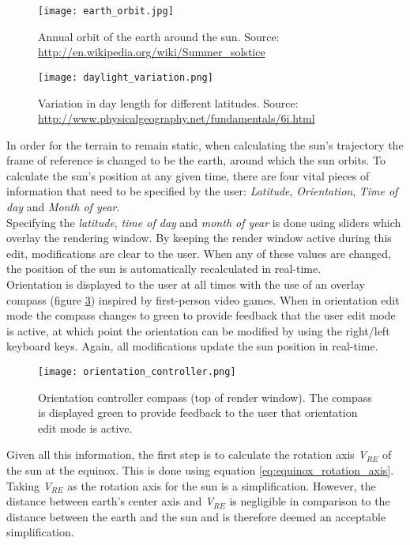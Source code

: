\begin{figure}
\center
	\texttt{[image: earth\_orbit.jpg]}
	\caption{ Annual orbit of the earth around the sun. Source: \protect\url{http://en.wikipedia.org/wiki/Summer_solstice}}
	\label{fig:earth_orbit}
\end{figure}

\begin{figure}
\center
	\texttt{[image: daylight\_variation.png]}
	\caption{ Variation in day length for different latitudes. Source: \protect\url{http://www.physicalgeography.net/fundamentals/6i.html}}
	\label{fig:daylight_variation}
\end{figure}

In order for the terrain to remain static, when calculating the sun's trajectory the frame of reference is changed to be the earth, around which the sun orbits. To calculate the sun's position at any given time, there are four vital pieces of information that need to be specified by the user: \textit{Latitude}, \textit{Orientation}, \textit{Time of day} and \textit{Month of year}. \\

Specifying the \textit{latitude}, \textit{time of day} and \textit{month of year} is done using sliders which overlay the rendering window. By keeping the render window active during this edit, modifications are clear to the user. When any of these values are changed, the position of the sun is automatically recalculated in real-time. \\

Orientation is displayed to the user at all times with the use of an overlay compass (figure \ref{fig:orientation_control}) inspired by first-person video games. When in orientation edit mode the compass changes to green to provide feedback that the user edit mode is active, at which point the orientation can be modified by using the right/left keyboard keys. Again, all modifications update the sun position in real-time.\\

\begin{figure}
\center
	\texttt{[image: orientation\_controller.png]}
	\caption{ Orientation controller compass (top of render window). The compass is displayed green to provide feedback to the user that orientation edit mode is active.}
	\label{fig:orientation_control}
\end{figure}

Given all this information, the first step is to calculate the rotation axis \textit{V$_{RE}$} of the sun at the equinox. This is done using equation \ref{eq:equinox_rotation_axis}. Taking \textit{V$_{RE}$} as the rotation axis for the sun is a simplification. However, the distance between earth's center axis and \textit{V$_{RE}$} is negligible in comparison to the distance between the earth and the sun and is therefore deemed an acceptable simplification.\\

